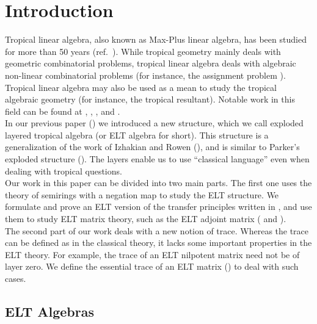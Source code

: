 \section{Introduction}

Tropical linear algebra, also known as Max-Plus linear algebra, has been studied for more than 50 years (ref.~\cite{B}). While tropical geometry mainly deals with geometric combinatorial problems, tropical linear algebra deals with algebraic non-linear combinatorial problems (for instance, the assignment problem \cite{K}). Tropical linear algebra may also be used as a mean to study the tropical algebraic geometry (for instance, the tropical resultant). Notable work in this field can be found at \cite{B}, \cite{DSS}, \cite{IR4}, \cite{IR3} and \cite{S}.\\

In our previous paper (\cite{BS}) we introduced a new structure, which we call exploded layered tropical algebra (or ELT algebra for short). This structure is a generalization of the work of Izhakian and Rowen (\cite{IR1}), and is similar to Parker's exploded structure (\cite{PR}). The layers enable us to use ``classical language'' even when dealing with tropical questions.\\

Our work in this paper can be divided into two main parts. The first one uses the theory of semirings with a negation map to study the ELT structure. We formulate and prove an ELT version of the transfer principles written in \cite{Akian2008}, and use them to study ELT matrix theory, such as the ELT adjoint matrix ( and ).\\

The second part of our work deals with a new notion of trace. Whereas the trace can be defined as in the classical theory, it lacks some important properties in the ELT theory. For example, the trace of an ELT nilpotent matrix need not be of layer zero. We define the essential trace of an ELT matrix () to deal with such cases.\\

\subsection{ELT Algebras}

